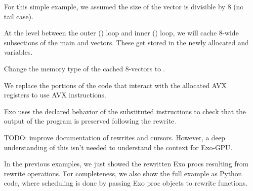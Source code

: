 

For this simple example, we assumed the size of the vector is divisible by 8 (no tail case).

\filbreak
{}

At the level between the outer () loop and inner () loop, we will cache 8-wide subsections of the main  and  vectors.
These get stored in the newly allocated  and  variables.



\filbreak
{}

Change the memory type of the cached 8-vectors to .



\filbreak
{}



We replace the portions of the code that interact with the allocated AVX registers to use AVX instructions.


\filbreak


\filbreak
Exo uses the declared behavior of the substituted instructions to check that the output of the program is preserved following the rewrite.

\filbreak
{}

TODO: improve documentation of rewrites and cursors.
However, a deep understanding of this isn't needed to understand the context for Exo-GPU.

\filbreak
In the previous examples, we just showed the rewritten Exo procs resulting from rewrite operations.
For completeness, we also show the full example as Python code, where scheduling is done by passing Exo proc objects to rewrite functions.

\filbreak

\filbreak

\filbreak

\filbreak

\filbreak


\filbreak
{}


